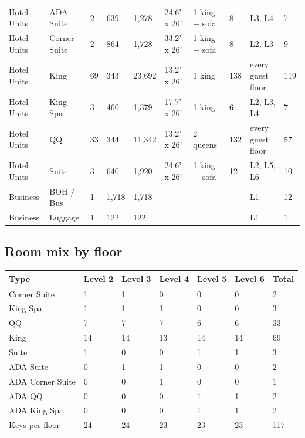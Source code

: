\documentclass[10pt]{article}
\begin{document}
{\begin{longtable}{p{1.4cm}p{3.0cm}p{0.8cm}p{1.0cm}p{1.1cm}p{1.6cm}p{1.6cm}p{0.9cm}p{2.2cm}p{0.7cm}}
Hotel Units & ADA Suite & 2 & 639 & 1,278 & 24.6' x 26' & 1 king + sofa & 8 & L3, L4 & 7 \\
Hotel Units & Corner Suite & 2 & 864 & 1,728 & 33.2' x 26' & 1 king + sofa & 8 & L2, L3 & 9 \\
Hotel Units & King & 69 & 343 & 23,692 & 13.2' x 26' & 1 king & 138 & every guest floor & 119 \\
Hotel Units & King Spa & 3 & 460 & 1,379 & 17.7' x 26' & 1 king & 6 & L2, L3, L4 & 7 \\
Hotel Units & QQ & 33 & 344 & 11,342 & 13.2' x 26' & 2 queens & 132 & every guest floor & 57 \\
Hotel Units & Suite & 3 & 640 & 1,920 & 24.6' x 26' & 1 king + sofa & 12 & L2, L5, L6 & 10 \\
Business & BOH / Bus & 1 & 1,718 & 1,718 &  &  &  & L1 & 12 \\
Business & Luggage & 1 & 122 & 122 &  &  &  & L1 & 1 \\
\bottomrule
\end{longtable}}

\subsection{Room mix by floor}
{\small \begin{longtable}{p{3.4cm}p{1.5cm}p{1.5cm}p{1.5cm}p{1.5cm}p{1.5cm}p{1.5cm}}
\toprule
\textbf{Type} & \textbf{Level 2} & \textbf{Level 3} & \textbf{Level 4} & \textbf{Level 5} & \textbf{Level 6} & \textbf{Total} \\ \midrule \endhead
Corner Suite & 1 & 1 & 0 & 0 & 0 & 2 \\
King Spa & 1 & 1 & 1 & 0 & 0 & 3 \\
QQ & 7 & 7 & 7 & 6 & 6 & 33 \\
King & 14 & 14 & 13 & 14 & 14 & 69 \\
Suite & 1 & 0 & 0 & 1 & 1 & 3 \\
ADA Suite & 0 & 1 & 1 & 0 & 0 & 2 \\
ADA Corner Suite & 0 & 0 & 1 & 0 & 0 & 1 \\
ADA QQ & 0 & 0 & 0 & 1 & 1 & 2 \\
ADA King Spa & 0 & 0 & 0 & 1 & 1 & 2 \\
Keys per floor & 24 & 24 & 23 & 23 & 23 & 117 \\
\bottomrule
\end{longtable}}
\end{document}
